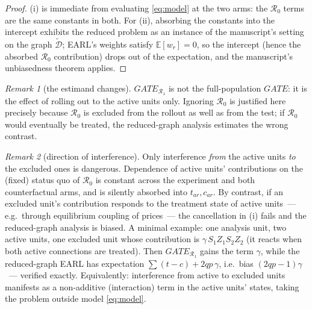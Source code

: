 \documentclass[11pt]{article}
\theoremstyle{remark}
\newtheorem{remark}{Remark}
\newcommand{\E}{\mathbb{E}}
\begin{document}
\begin{proof}
(i) is immediate from evaluating \eqref{eq:model} at the two arms: the $\mathcal R_0$ terms are the same constants in both. For (ii), absorbing the constants into the intercept exhibits the reduced problem as an instance of the manuscript's setting on the graph $\widetilde{\mathcal D}$; EARL's weights satisfy $\E[w_r] = 0$, so the intercept (hence the absorbed $\mathcal R_0$ contribution) drops out of the expectation, and the manuscript's unbiasedness theorem applies.
\end{proof}

\begin{remark}[the estimand changes]
$GATE_{\mathcal R_1}$ is not the full-population $GATE$: it is the effect of rolling out to the active units only. Ignoring $\mathcal R_0$ is justified here precisely because $\mathcal R_0$ is excluded from the rollout as well as from the test; if $\mathcal R_0$ would eventually be treated, the reduced-graph analysis estimates the wrong contrast.
\end{remark}

\begin{remark}[direction of interference]
Only interference \emph{from} the active units \emph{to} the excluded ones is dangerous. Dependence of active units' contributions on the (fixed) status quo of $\mathcal R_0$ is constant across the experiment and both counterfactual arms, and is silently absorbed into $t_{ar}, c_{ar}$. By contrast, if an excluded unit's contribution responds to the treatment state of active units~--- e.g.\ through equilibrium coupling of prices~--- the cancellation in (i) fails and the reduced-graph analysis is biased. A minimal example: one analysis unit, two active units, one excluded unit whose contribution is $\gamma\, S_1Z_1S_2Z_2$ (it reacts when both active connections are treated). Then $GATE_{\mathcal R_1}$ gains the term $\gamma$, while the reduced-graph EARL has expectation $\sum(t-c) + 2qp\,\gamma$, i.e.\ bias $(2qp-1)\gamma$~--- verified exactly. Equivalently: interference from active to excluded units manifests as a non-additive (interaction) term in the active units' states, taking the problem outside model \eqref{eq:model}.
\end{remark}
\end{document}
